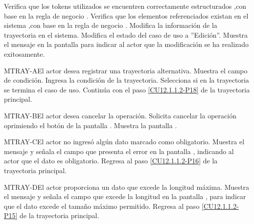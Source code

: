 \begin{UCtrayectoria}
		\UCpaso[\UCsist] Verifica que los tokens utilizados se encuentren correctamente estructurados ,con base en la regla de negocio . 
		\UCpaso[\UCsist] Verifica que los elementos referenciados existan en el sistema ,con base en la regla de negocio . 
		\UCpaso[\UCsist] Modifica la información de la trayectoria en el sistema.
		\UCpaso[\UCsist] Modifica el estado del caso de uso a ''Edición''.
		\UCpaso[\UCsist] Muestra el mensaje  en la pantalla  para indicar al actor que la modificación se ha realizado exitosamente.
	\end{UCtrayectoria}		
	
	\begin{UCtrayectoriaA}{MTRAY-A}{El actor desea registrar una trayectoria alternativa.}
		\UCpaso[\UCsist] Muestra el campo de condición.
		\UCpaso[\UCactor] Ingresa la condición de la trayectoria.
		\UCpaso[\UCactor] Selecciona si en la trayectoria se termina el caso de uso.
		\UCpaso Continúa con el paso \ref{CU12.1.1.2-P18} de la trayectoria principal.
	\end{UCtrayectoriaA}

	\begin{UCtrayectoriaA}{MTRAY-B}{El actor desea cancelar la operación.}
		\UCpaso[\UCactor] Solicita cancelar la operación oprimiendo el botón  de la pantalla .
		\UCpaso[\UCsist] Muestra la pantalla .
	\end{UCtrayectoriaA}

	\begin{UCtrayectoriaA}{MTRAY-C}{El actor no ingresó algún dato marcado como obligatorio.}
		\UCpaso[\UCsist] Muestra el mensaje  y señala el campo que presenta el error en la pantalla , indicando al actor que el dato es obligatorio.
		\UCpaso Regresa al paso \ref{CU12.1.1.2-P16} de la trayectoria principal.
	\end{UCtrayectoriaA}

	\begin{UCtrayectoriaA}{MTRAY-D}{El actor proporciona un dato que excede la longitud máxima.}
		\UCpaso[\UCsist] Muestra el mensaje  y señala el campo que excede la longitud en la pantalla , para indicar que el dato excede el tamaño máximo permitido.
		\UCpaso Regresa al paso \ref{CU12.1.1.2-P15} de la trayectoria principal.
	\end{UCtrayectoriaA}

